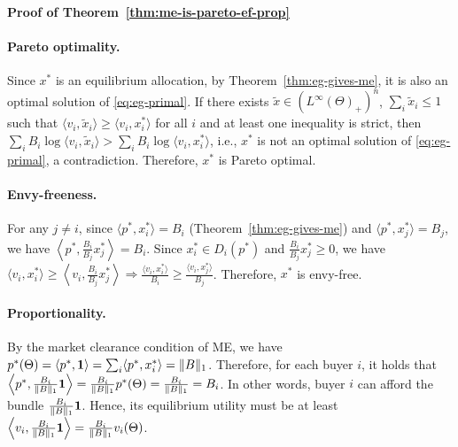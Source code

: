 	\smallskip\noindent\textbf{Proof of Theorem~\ref{thm:me-is-pareto-ef-prop}}

	\paragraph{Pareto optimality.}
	Since $x^*$ is an equilibrium allocation, by Theorem~\ref{thm:eg-gives-me}, it is also an optimal solution of \eqref{eq:eg-primal}. If there exists $\tilde{x}\in (L^\infty(\Theta)_+)^n$, $\sum_i \tilde{x}_i \leq 1$ such that $\langle v_i, \tilde{x}_i \rangle \geq \langle v_i, x^*_i \rangle$ for all $i$ and at least one inequality is strict, then 
	$\sum_i B_i \log \langle v_i, \tilde{x}_i \rangle > \sum_i B_i \log \langle v_i, x^*_i \rangle$,
	i.e., $x^*$ is not an optimal solution of \eqref{eq:eg-primal}, a contradiction. Therefore, $x^*$ is Pareto optimal.
	
	\paragraph{Envy-freeness.}
	For any $j\neq i$, since $\langle p^*, x^*_i \rangle = B_i$ (Theorem~\ref{thm:eg-gives-me}) and $\langle p^*, x^*_j \rangle = B_j$, we have 
	$ \left \langle p^*, \frac{B_i}{B_j}x^*_j \right \rangle = B_i$.
	Since $x^*_i \in D_i(p^*)$ and $\frac{B_i}{B_j}x^*_j \geq 0$, we have 
	$ \langle v_i, x^*_i \rangle \geq \left\langle v_i, \frac{B_i}{B_j} x^*_j \right \rangle \Rightarrow \frac{\langle v_i, x^*_i \rangle}{B_i} \geq \frac{\langle v_i, x^*_j \rangle}{B_j}$.
	Therefore, $x^*$ is envy-free.
	
	\paragraph{Proportionality.}
	By the market clearance condition of ME, we have
	$ p^*(\Theta) = \langle p^*, \mathbf{1} \rangle = \sum_i \langle p^*, x^*_i\rangle = \|B\|_1$.
	Therefore, for each buyer $i$, it holds that 
	$ \left \langle p^*, \frac{B_i}{\|B\|_1} \mathbf{1} \right \rangle = \frac{B_i}{\|B\|_1} p^*(\Theta) = \frac{B_i}{\|B\|_1} = B_i$.
	In other words, buyer $i$ can afford the bundle $\frac{B_i}{\|B\|_1} \mathbf{1} $. Hence, its equilibrium utility must be at least
	$ \left \langle v_i,\frac{B_i}{\|B\|_1}\mathbf{1} \right\rangle = \frac{B_i}{\|B\|_1}v_i(\Theta)$.
	
